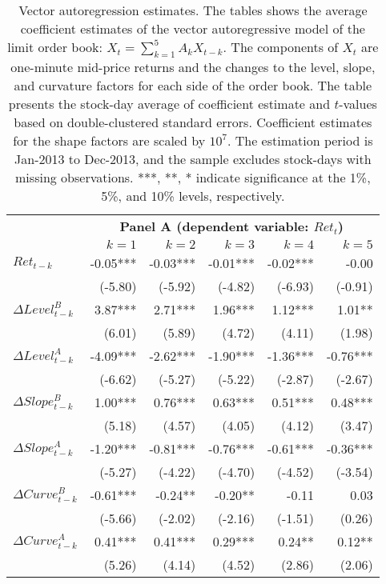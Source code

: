 \begin{table}[p]
	\small
	\linespread{1}
	\centering
	\begin{tabular}{lrrrrr}
	\toprule
	& \multicolumn{5}{c}{\textbf{Panel A (dependent variable: $Ret_t$)}} \\
	\cmidrule(l{2pt}r{2pt}){2-6}
	& $k=1$ & $k=2$ & $k=3$ & $k=4$ & $k=5$ \\
	\midrule
	$Ret_{t-k}$ 			& -0.05*** & -0.03*** & -0.01*** & -0.02*** & -0.00 \\
							& (-5.80) & (-5.92) & (-4.82) & (-6.93) & (-0.91) \\
	$\Delta Level^B_{t-k}$ 	& 3.87*** & 2.71*** & 1.96*** & 1.12*** & 1.01** \\ %
							& (6.01) & (5.89) & (4.72) & (4.11) & (1.98) \\
	$\Delta Level^A_{t-k}$ 	& -4.09*** & -2.62*** & -1.90*** & -1.36*** & -0.76*** \\ %
							& (-6.62) & (-5.27) & (-5.22) & (-2.87) & (-2.67) \\
	$\Delta Slope^B_{t-k}$	& 1.00*** & 0.76*** & 0.63*** & 0.51*** & 0.48*** \\ %
							& (5.18) & (4.57) & (4.05) & (4.12) & (3.47) \\
	$\Delta Slope^A_{t-k}$ 	& -1.20*** & -0.81*** & -0.76*** & -0.61*** & -0.36*** \\ %
							& (-5.27) & (-4.22) & (-4.70) & (-4.52) & (-3.54) \\
	$\Delta Curve^B_{t-k}$ 	& -0.61*** & -0.24** & -0.20** & -0.11 & 0.03 \\ %
							& (-5.66) & (-2.02) & (-2.16) & (-1.51) & (0.26) \\
	$\Delta Curve^A_{t-k}$ 	& 0.41*** & 0.41*** & 0.29*** & 0.24** & 0.12** \\ %
							& (5.26) & (4.14) & (4.52) & (2.86) & (2.06) \\
	\bottomrule
	\end{tabular}
	\captionsetup{position=below, font=footnotesize, justification=justified, width=0.75\linewidth}
	\caption[Vector autoregression estimates]{Vector autoregression estimates. The tables shows the average coefficient estimates of the vector autoregressive model of the limit order book: $X_t = \sum_{k=1}^{5} A_{k} X_{t-k}.$ The components of $X_t$ are one-minute mid-price returns and the changes to the level, slope, and curvature factors for each side of the order book. The table presents the stock-day average of coefficient estimate and $t$-values based on double-clustered standard errors. Coefficient estimates for the shape factors are scaled by $10^7$. The estimation period is Jan-2013 to Dec-2013, and the sample excludes stock-days with missing observations. ***, **, * indicate significance at the 1\%, 5\%, and 10\% levels, respectively.}
	\label{tab:var}
\end{table}

